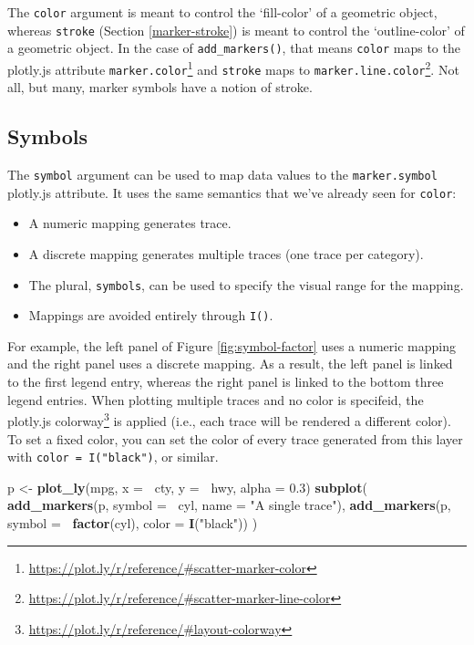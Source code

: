 \documentclass[
  12pt,
]{krantz}
\newenvironment{Shaded}{\begin{snugshade}}{\end{snugshade}}
\newcommand{\DataTypeTok}[1]{\textcolor[rgb]{0.13,0.29,0.53}{#1}}
\newcommand{\FloatTok}[1]{\textcolor[rgb]{0.00,0.00,0.81}{#1}}
\newcommand{\KeywordTok}[1]{\textcolor[rgb]{0.13,0.29,0.53}{\textbf{#1}}}
\newcommand{\NormalTok}[1]{#1}
\newcommand{\OperatorTok}[1]{\textcolor[rgb]{0.81,0.36,0.00}{\textbf{#1}}}
\newcommand{\StringTok}[1]{\textcolor[rgb]{0.31,0.60,0.02}{#1}}
\providecommand{\tightlist}{%
  \setlength{\itemsep}{0pt}\setlength{\parskip}{0pt}}
\renewcommand{\href}[2]{#2\footnote{\url{#1}}}
\begin{document}
The \texttt{color} argument is meant to control the `fill-color' of a geometric object, whereas \texttt{stroke} (Section \ref{marker-stroke}) is meant to control the `outline-color' of a geometric object. In the case of \texttt{add\_markers()}, that means \texttt{color} maps to the plotly.js attribute \href{https://plot.ly/r/reference/\#scatter-marker-color}{\texttt{marker.color}} and \texttt{stroke} maps to \href{https://plot.ly/r/reference/\#scatter-marker-line-color}{\texttt{marker.line.color}}. Not all, but many, marker symbols have a notion of stroke.

\hypertarget{marker-symbol}{%
\subsection{Symbols}\label{marker-symbol}}


The \texttt{symbol} argument can be used to map data values to the \texttt{marker.symbol} plotly.js attribute. It uses the same semantics that we've already seen for \texttt{color}:

\begin{itemize}
\tightlist
\item
  A numeric mapping generates trace.
\item
  A discrete mapping generates multiple traces (one trace per category).
\item
  The plural, \texttt{symbols}, can be used to specify the visual range for the mapping.
\item
  Mappings are avoided entirely through \texttt{I()}.
\end{itemize}

For example, the left panel of Figure \ref{fig:symbol-factor} uses a numeric mapping and the right panel uses a discrete mapping. As a result, the left panel is linked to the first legend entry, whereas the right panel is linked to the bottom three legend entries. When plotting multiple traces and no color is specifeid, the plotly.js \href{https://plot.ly/r/reference/\#layout-colorway}{colorway} is applied (i.e., each trace will be rendered a different color). To set a fixed color, you can set the color of every trace generated from this layer with \texttt{color\ =\ I("black")}, or similar.

\begin{Shaded}
\begin{Highlighting}[]
\NormalTok{p <-}\StringTok{ }\KeywordTok{plot_ly}\NormalTok{(mpg, }\DataTypeTok{x =} \OperatorTok{~}\NormalTok{cty, }\DataTypeTok{y =} \OperatorTok{~}\NormalTok{hwy, }\DataTypeTok{alpha =} \FloatTok{0.3}\NormalTok{) }
\KeywordTok{subplot}\NormalTok{(}
  \KeywordTok{add_markers}\NormalTok{(p, }\DataTypeTok{symbol =} \OperatorTok{~}\NormalTok{cyl, }\DataTypeTok{name =} \StringTok{"A single trace"}\NormalTok{),}
  \KeywordTok{add_markers}\NormalTok{(p, }\DataTypeTok{symbol =} \OperatorTok{~}\KeywordTok{factor}\NormalTok{(cyl), }\DataTypeTok{color =} \KeywordTok{I}\NormalTok{(}\StringTok{"black"}\NormalTok{))}
\NormalTok{)}
\end{Highlighting}
\end{Shaded}
\end{document}
